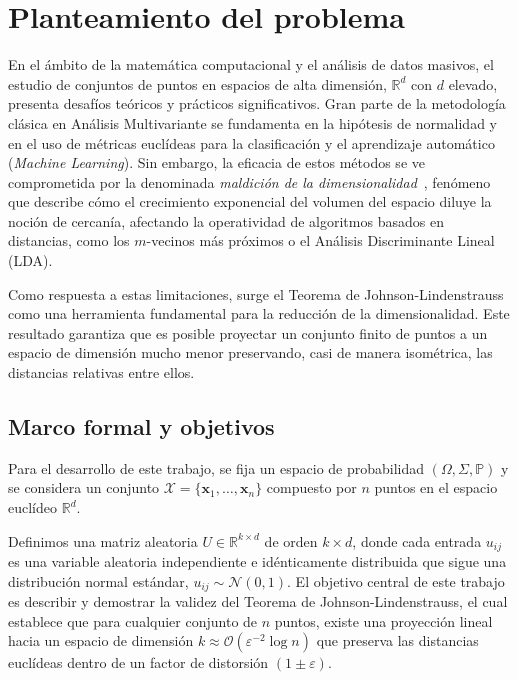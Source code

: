 \chapter{Planteamiento del problema}

En el ámbito de la matemática computacional y el análisis de datos
masivos, el estudio de conjuntos de puntos en espacios de alta
dimensión, $\mathbb{R}^d$ con $d$ elevado, presenta desafíos teóricos
y prácticos significativos.
Gran parte de la metodología clásica en Análisis Multivariante se
fundamenta en la hipótesis de normalidad y en el uso de métricas
euclídeas para la clasificación y el aprendizaje automático
(\textit{Machine Learning}).
Sin embargo, la eficacia de estos métodos se ve comprometida por la
denominada \textit{maldición de la dimensionalidad}~\cite{Bellman1958},
fenómeno que describe cómo el crecimiento exponencial del volumen del
espacio diluye la noción de cercanía, afectando la operatividad de
algoritmos basados en distancias, como los $m$-vecinos más próximos o
el Análisis Discriminante Lineal (LDA).

Como respuesta a estas limitaciones, surge el Teorema de
Johnson-Lindenstrauss como una herramienta fundamental para la
reducción de la dimensionalidad.
Este resultado garantiza que es posible proyectar un conjunto finito
de puntos a un espacio de dimensión mucho menor preservando, casi de
manera isométrica, las distancias relativas entre ellos.

\section{Marco formal y objetivos}

Para el desarrollo de este trabajo, se fija un espacio de
probabilidad $\left(\Omega,\Sigma,\mathbb{P}\right)$ y se considera
un conjunto $\mathcal{X}=\{\symbf{x}_{1},\dotsc,\symbf{x}_{n}\}$
compuesto por $n$ puntos en el espacio euclídeo $\mathbb{R}^{d}$.

Definimos una matriz aleatoria $U\in\mathbb{R}^{k\times d}$ de orden
$k \times d$, donde cada entrada $u_{ij}$ es una variable aleatoria
independiente e idénticamente distribuida que sigue una distribución normal estándar,
$u_{ij}\sim\mathcal{N}\left(0,1\right)$.
El objetivo central de este trabajo es describir y demostrar la validez del Teorema de
Johnson-Lindenstrauss, el cual establece que para cualquier conjunto de $n$ puntos,
existe una proyección lineal hacia un espacio de dimensión $k\approx\mathcal{O}(\varepsilon^{-2}\log n)$
que preserva las distancias euclídeas dentro de un factor de distorsión $(1\pm\varepsilon)$.

